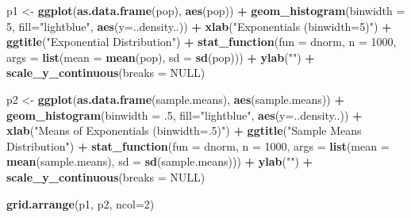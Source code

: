 \documentclass[]{article}
\newenvironment{Shaded}{\begin{snugshade}}{\end{snugshade}}
\newcommand{\KeywordTok}[1]{\textcolor[rgb]{0.13,0.29,0.53}{\textbf{#1}}}
\newcommand{\DataTypeTok}[1]{\textcolor[rgb]{0.13,0.29,0.53}{#1}}
\newcommand{\DecValTok}[1]{\textcolor[rgb]{0.00,0.00,0.81}{#1}}
\newcommand{\StringTok}[1]{\textcolor[rgb]{0.31,0.60,0.02}{#1}}
\newcommand{\OtherTok}[1]{\textcolor[rgb]{0.56,0.35,0.01}{#1}}
\newcommand{\OperatorTok}[1]{\textcolor[rgb]{0.81,0.36,0.00}{\textbf{#1}}}
\newcommand{\NormalTok}[1]{#1}
\begin{document}
\begin{Shaded}
\begin{Highlighting}[]
\NormalTok{p1 <-}\StringTok{ }\KeywordTok{ggplot}\NormalTok{(}\KeywordTok{as.data.frame}\NormalTok{(pop), }\KeywordTok{aes}\NormalTok{(pop)) }\OperatorTok{+}\StringTok{ }
\StringTok{  }\KeywordTok{geom_histogram}\NormalTok{(}\DataTypeTok{binwidth =} \DecValTok{5}\NormalTok{, }\DataTypeTok{fill=}\StringTok{"lightblue"}\NormalTok{, }\KeywordTok{aes}\NormalTok{(}\DataTypeTok{y=}\NormalTok{..density..)) }\OperatorTok{+}
\StringTok{  }\KeywordTok{xlab}\NormalTok{(}\StringTok{"Exponentials (binwidth=5)"}\NormalTok{) }\OperatorTok{+}
\StringTok{  }\KeywordTok{ggtitle}\NormalTok{(}\StringTok{"Exponential Distribution"}\NormalTok{) }\OperatorTok{+}
\StringTok{  }\KeywordTok{stat_function}\NormalTok{(}\DataTypeTok{fun =}\NormalTok{ dnorm, }\DataTypeTok{n =} \DecValTok{1000}\NormalTok{, }\DataTypeTok{args =} \KeywordTok{list}\NormalTok{(}\DataTypeTok{mean =} \KeywordTok{mean}\NormalTok{(pop), }\DataTypeTok{sd =} \KeywordTok{sd}\NormalTok{(pop))) }\OperatorTok{+}
\StringTok{  }\KeywordTok{ylab}\NormalTok{(}\StringTok{""}\NormalTok{) }\OperatorTok{+}
\StringTok{  }\KeywordTok{scale_y_continuous}\NormalTok{(}\DataTypeTok{breaks =} \OtherTok{NULL}\NormalTok{)}

\NormalTok{p2 <-}\StringTok{ }\KeywordTok{ggplot}\NormalTok{(}\KeywordTok{as.data.frame}\NormalTok{(sample.means), }\KeywordTok{aes}\NormalTok{(sample.means)) }\OperatorTok{+}\StringTok{ }
\StringTok{  }\KeywordTok{geom_histogram}\NormalTok{(}\DataTypeTok{binwidth =}\NormalTok{ .}\DecValTok{5}\NormalTok{, }\DataTypeTok{fill=}\StringTok{"lightblue"}\NormalTok{, }\KeywordTok{aes}\NormalTok{(}\DataTypeTok{y=}\NormalTok{..density..)) }\OperatorTok{+}
\StringTok{  }\KeywordTok{xlab}\NormalTok{(}\StringTok{"Means of Exponentials (binwidth=.5)"}\NormalTok{) }\OperatorTok{+}
\StringTok{  }\KeywordTok{ggtitle}\NormalTok{(}\StringTok{"Sample Means Distribution"}\NormalTok{) }\OperatorTok{+}
\StringTok{  }\KeywordTok{stat_function}\NormalTok{(}\DataTypeTok{fun =}\NormalTok{ dnorm, }\DataTypeTok{n =} \DecValTok{1000}\NormalTok{, }\DataTypeTok{args =} \KeywordTok{list}\NormalTok{(}\DataTypeTok{mean =} \KeywordTok{mean}\NormalTok{(sample.means), }\DataTypeTok{sd =} \KeywordTok{sd}\NormalTok{(sample.means))) }\OperatorTok{+}
\StringTok{  }\KeywordTok{ylab}\NormalTok{(}\StringTok{""}\NormalTok{) }\OperatorTok{+}
\StringTok{  }\KeywordTok{scale_y_continuous}\NormalTok{(}\DataTypeTok{breaks =} \OtherTok{NULL}\NormalTok{)}

\KeywordTok{grid.arrange}\NormalTok{(p1, p2, }\DataTypeTok{ncol=}\DecValTok{2}\NormalTok{)}
\end{Highlighting}
\end{Shaded}
\end{document}

